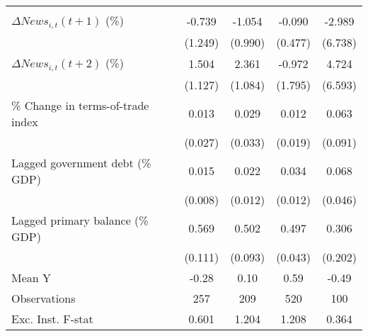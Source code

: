 {\begin{tabular}{l*{4}{c}}
                    &                     &                     &                     &                     \\
\addlinespace
$ \Delta News_{i,t}(t+1)$ (\%)&      -0.739         &      -1.054         &      -0.090         &      -2.989         \\
                    &     (1.249)         &     (0.990)         &     (0.477)         &     (6.738)         \\
\addlinespace
$ \Delta News_{i,t}(t+2)$ (\%)&       1.504         &       2.361\sym{**} &      -0.972         &       4.724         \\
                    &     (1.127)         &     (1.084)         &     (1.795)         &     (6.593)         \\
\addlinespace
\% Change in terms-of-trade index&       0.013         &       0.029         &       0.012         &       0.063         \\
                    &     (0.027)         &     (0.033)         &     (0.019)         &     (0.091)         \\
\addlinespace
Lagged government debt (\% GDP)&       0.015\sym{*}  &       0.022\sym{*}  &       0.034\sym{***}&       0.068         \\
                    &     (0.008)         &     (0.012)         &     (0.012)         &     (0.046)         \\
\addlinespace
Lagged primary balance (\% GDP)&       0.569\sym{***}&       0.502\sym{***}&       0.497\sym{***}&       0.306         \\
                    &     (0.111)         &     (0.093)         &     (0.043)         &     (0.202)         \\
\midrule
Mean Y              &       -0.28         &        0.10         &        0.59         &       -0.49         \\
Observations        &         257         &         209         &         520         &         100         \\
Exc. Inst. F-stat   &       0.601         &       1.204         &       1.208         &       0.364         \\
\bottomrule
\end{tabular}
}
